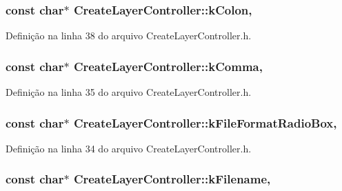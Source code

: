 \subsubsection[{k\+Colon}]{\setlength{\rightskip}{0pt plus 5cm}const char$\ast$ Create\+Layer\+Controller\+::k\+Colon\hspace{0.3cm}{\ttfamily [static]}, {\ttfamily [protected]}}\label{class_create_layer_controller_a448134ae7fa70f2c97c5bc0474838ef0}


Definição na linha 38 do arquivo Create\+Layer\+Controller.\+h.

\subsubsection[{k\+Comma}]{\setlength{\rightskip}{0pt plus 5cm}const char$\ast$ Create\+Layer\+Controller\+::k\+Comma\hspace{0.3cm}{\ttfamily [static]}, {\ttfamily [protected]}}\label{class_create_layer_controller_a1a56ca3a5a75996867d1d84d96ac443d}


Definição na linha 35 do arquivo Create\+Layer\+Controller.\+h.

\subsubsection[{k\+File\+Format\+Radio\+Box}]{\setlength{\rightskip}{0pt plus 5cm}const char$\ast$ Create\+Layer\+Controller\+::k\+File\+Format\+Radio\+Box\hspace{0.3cm}{\ttfamily [static]}, {\ttfamily [protected]}}\label{class_create_layer_controller_aa25fa7e1e630377d04f07eb8a3cc3c1f}


Definição na linha 34 do arquivo Create\+Layer\+Controller.\+h.

\subsubsection[{k\+Filename}]{\setlength{\rightskip}{0pt plus 5cm}const char$\ast$ Create\+Layer\+Controller\+::k\+Filename\hspace{0.3cm}{\ttfamily [static]}, {\ttfamily [protected]}}\label{class_create_layer_controller_a841d4487146ca6d2e945212daa119978}


